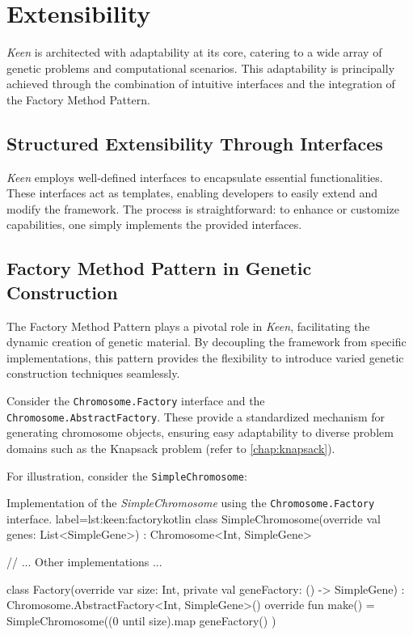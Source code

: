 \section{Extensibility}
\label{sec:keen:extensibility}

  \textit{Keen} is architected with adaptability at its core, catering to a 
  wide array of genetic problems and computational scenarios. This adaptability 
  is principally achieved through the combination of intuitive interfaces and 
  the integration of the Factory Method Pattern.

  \subsection{Structured Extensibility Through Interfaces}
    \textit{Keen} employs well-defined interfaces to encapsulate essential 
    functionalities. These interfaces act as templates, enabling developers to 
    easily extend and modify the framework. The process is straightforward: to 
    enhance or customize capabilities, one simply implements the provided 
    interfaces.

  \subsection{Factory Method Pattern in Genetic Construction}
    The Factory Method Pattern plays a pivotal role in \textit{Keen}, 
    facilitating the dynamic creation of genetic material. By decoupling the 
    framework from specific implementations, this pattern provides the 
    flexibility to introduce varied genetic construction techniques seamlessly.

    Consider the \texttt{Chromosome.Factory} interface and the 
    \texttt{Chromosome.AbstractFactory}. These provide a standardized mechanism 
    for generating chromosome objects, ensuring easy adaptability to diverse 
    problem domains such as the Knapsack problem (refer to 
    \vref{chap:knapsack}).

    For illustration, consider the \texttt{SimpleChromosome}:

    \begin{code}{
      Implementation of the \textit{SimpleChromosome} using the 
      \texttt{Chromosome.Factory} interface.
    }{label=lst:keen:factory}{kotlin}
      class SimpleChromosome(override val genes: List<SimpleGene>) :
          Chromosome<Int, SimpleGene> {
          // ... Other implementations ...

          class Factory(override var size: Int, private val geneFactory: () -> SimpleGene) :
              Chromosome.AbstractFactory<Int, SimpleGene>() {
              override fun make() = SimpleChromosome((0 until size).map { geneFactory() })
          }
      }
    \end{code}

